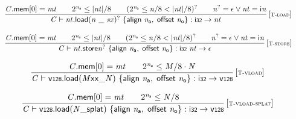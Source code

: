 $$
\begin{array}{@{}c@{}}\displaystyle
\frac{
{\mathit{C}}.\mathsf{mem}{}[0] = {\mathit{mt}}
 \qquad
{2^{{\mathit{n}}_{{\mathsf{a}}}}} \leq {|{\mathit{nt}}|} / 8
 \qquad
({2^{{\mathit{n}}_{{\mathsf{a}}}}} \leq {\mathit{n}} / 8 < {|{\mathit{nt}}|} / 8)^?
 \qquad
{{\mathit{n}}^?} = \epsilon \lor {\mathit{nt}} = {\mathsf{i}}{{\mathit{n}}}
}{
{\mathit{C}} \vdash {{\mathit{nt}}.\mathsf{load}}{{({\mathit{n}}~\mathsf{\_}~{\mathit{sx}})^?}}~\{ \begin{array}[t]{@{}l@{}}
\mathsf{align}~{\mathit{n}}_{{\mathsf{a}}},\; \mathsf{offset}~{\mathit{n}}_{{\mathsf{o}}} \}\end{array} : \mathsf{i{\scriptstyle32}} \rightarrow {\mathit{nt}}
} \, {[\textsc{\scriptsize T{-}load}]}
\qquad
\end{array}
$$

$$
\begin{array}{@{}c@{}}\displaystyle
\frac{
{\mathit{C}}.\mathsf{mem}{}[0] = {\mathit{mt}}
 \qquad
{2^{{\mathit{n}}_{{\mathsf{a}}}}} \leq {|{\mathit{nt}}|} / 8
 \qquad
({2^{{\mathit{n}}_{{\mathsf{a}}}}} \leq {\mathit{n}} / 8 < {|{\mathit{nt}}|} / 8)^?
 \qquad
{{\mathit{n}}^?} = \epsilon \lor {\mathit{nt}} = {\mathsf{i}}{{\mathit{n}}}
}{
{\mathit{C}} \vdash {{\mathit{nt}}.\mathsf{store}}{{{\mathit{n}}^?}}~\{ \begin{array}[t]{@{}l@{}}
\mathsf{align}~{\mathit{n}}_{{\mathsf{a}}},\; \mathsf{offset}~{\mathit{n}}_{{\mathsf{o}}} \}\end{array} : \mathsf{i{\scriptstyle32}}~{\mathit{nt}} \rightarrow \epsilon
} \, {[\textsc{\scriptsize T{-}store}]}
\qquad
\end{array}
$$

$$
\begin{array}{@{}c@{}}\displaystyle
\frac{
{\mathit{C}}.\mathsf{mem}{}[0] = {\mathit{mt}}
 \qquad
{2^{{\mathit{n}}_{{\mathsf{a}}}}} \leq {\mathit{M}} / 8 \cdot {\mathit{N}}
}{
{\mathit{C}} \vdash {\mathsf{v{\scriptstyle128}.load}}{({{{{{\mathit{M}}}{\mathsf{x}}}{\mathsf{x}}}{\mathsf{\_}}}{{\mathit{N}}})}~\{ \begin{array}[t]{@{}l@{}}
\mathsf{align}~{\mathit{n}}_{{\mathsf{a}}},\; \mathsf{offset}~{\mathit{n}}_{{\mathsf{o}}} \}\end{array} : \mathsf{i{\scriptstyle32}} \rightarrow \mathsf{v{\scriptstyle128}}
} \, {[\textsc{\scriptsize T{-}vload}]}
\qquad
\end{array}
$$

$$
\begin{array}{@{}c@{}}\displaystyle
\frac{
{\mathit{C}}.\mathsf{mem}{}[0] = {\mathit{mt}}
 \qquad
{2^{{\mathit{n}}_{{\mathsf{a}}}}} \leq {\mathit{N}} / 8
}{
{\mathit{C}} \vdash {\mathsf{v{\scriptstyle128}.load}}{({{{\mathit{N}}}{\mathsf{\_}}}{\mathsf{splat}})}~\{ \begin{array}[t]{@{}l@{}}
\mathsf{align}~{\mathit{n}}_{{\mathsf{a}}},\; \mathsf{offset}~{\mathit{n}}_{{\mathsf{o}}} \}\end{array} : \mathsf{i{\scriptstyle32}} \rightarrow \mathsf{v{\scriptstyle128}}
} \, {[\textsc{\scriptsize T{-}vload{-}splat}]}
\qquad
\end{array}
$$

